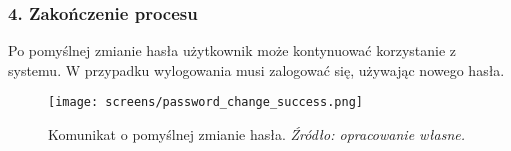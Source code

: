 \documentclass[12pt,a4paper,oneside]{article}
\theoremstyle{definition}
\numberwithin{equation}{section}
\begin{document}
\subsubsection*{\textbf{4. Zakończenie procesu}}
Po pomyślnej zmianie hasła użytkownik może kontynuować korzystanie z systemu. W przypadku wylogowania musi zalogować się, używając nowego hasła.

\begin{figure}[H]
    \centering
    \texttt{[image: screens/password\_change\_success.png]}
    \caption{Komunikat o pomyślnej zmianie hasła. \emph{Źródło: opracowanie własne.}}
    \label{fig:password_change_success}
\end{figure}

\newpage
{}
\listoffigures
%
%
%
%
\end{document}
